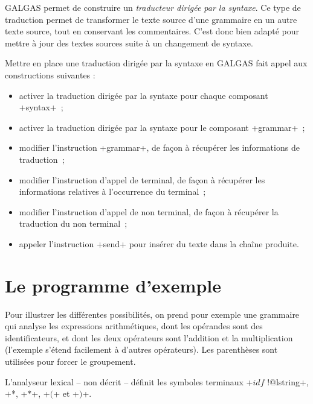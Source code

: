 

GALGAS permet de construire un \emph{traducteur dirigée par la syntaxe}. Ce type de traduction permet de transformer le texte source d'une grammaire en un autre texte source, tout en conservant les commentaires. C'est donc bien adapté pour mettre à jour des textes sources suite à un changement de syntaxe.

Mettre en place une traduction dirigée par la syntaxe en GALGAS fait appel aux constructions suivantes :
\begin{itemize}
  \item activer la traduction dirigée par la syntaxe pour chaque composant \ggs+syntax+~;
  \item activer la traduction dirigée par la syntaxe pour le composant \ggs+grammar+~;
  \item modifier l'instruction \ggs+grammar+, de façon à récupérer les informations de traduction~;
  \item modifier l'instruction d'appel de terminal, de façon à récupérer les informations relatives à l'occurrence du terminal~;
  \item modifier l'instruction d'appel de non terminal, de façon à récupérer la traduction du non terminal~;
  \item appeler l'instruction \ggs+send+ pour insérer du texte dans la chaîne produite.
\end{itemize}








\section{Le programme d'exemple}

Pour illustrer les différentes possibilités, on prend pour exemple une grammaire qui analyse les expressions arithmétiques, dont les opérandes sont des identificateurs, et dont les deux opérateurs sont l'addition et la multiplication (l'exemple s'étend facilement à d'autres opérateurs). Les parenthèses sont utilisées pour forcer le groupement.

L'analyseur lexical -- non décrit -- définit les symboles terminaux \ggs+$idf$ !@lstring+, \ggs*$+$*, \ggs+$*$+, \ggs+$($+ et \ggs+$)$+.

